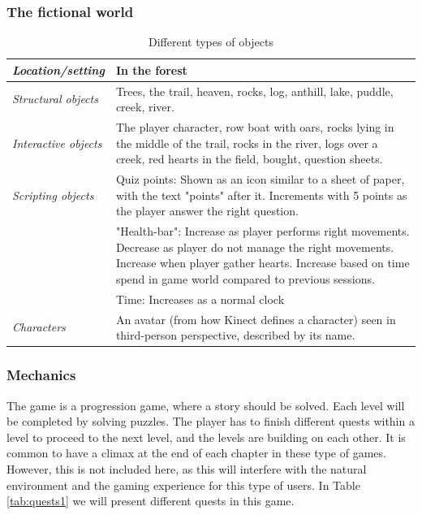 \subsubsection{The fictional world} 

\begin{table} [H]
\centering
    \begin{tabular}{|p{}|p{}|}
       \hline
        \emph{Location/setting} & In the forest  \\ \hline
       \emph{Structural objects} & Trees, the trail, heaven, rocks, log, anthill, lake, puddle, creek, river.  \\ \hline
       \emph{Interactive objects} & The player character, row boat with oars, rocks lying in the middle of the trail, rocks in the river, logs over a creek, red hearts in the field, bought, question sheets. \\ \hline
	   \emph{Scripting objects} & Quiz points: Shown as an icon similar to a sheet of paper, with the text "points" after it. Increments with 5 points as the player answer the right question.\\ \hline
	     & "Health-bar": Increase as player performs right movements. Decrease as player do not manage the right movements. Increase when player gather hearts. Increase based on time spend in game world compared to previous sessions. 
	      \\ \hline
	       & Time: Increases as a normal clock \\ \hline
	       \emph{Characters} & An avatar (from how Kinect defines a character) seen in third-person perspective, described by its name. \\ \hline
    \end{tabular}
    \caption[Various objects in the "Nature Trail"]{Different types of objects}
    \label{tab:objects1}
\end{table}  

\subsubsection{Mechanics} 

The game is a progression game, where a story should be solved. Each level will be completed by solving puzzles. The player has to finish different quests within a level to proceed to the next level, and the levels are building on each other. It is common to have a climax at the end of each chapter in these type of games. However, this is not included here, as this will interfere with the natural environment and the gaming experience for this type of users. In Table \ref{tab:quests1} we will present different quests in this game. 
  
